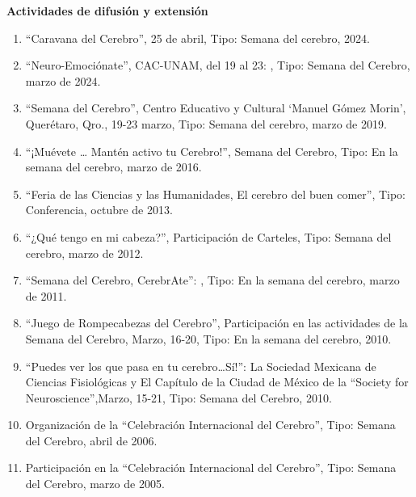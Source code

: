 {\large \textbf{Actividades de difusión y extensión}}

\hrulefill

\begin{enumerate}

\item “Caravana del Cerebro”, 25 de abril, Tipo: Semana del cerebro, 2024.

\item “Neuro-Emociónate”, CAC-UNAM, del 19 al 23: , Tipo: Semana del Cerebro, marzo de 2024.

\item “Semana del Cerebro”, Centro Educativo y Cultural ‘Manuel Gómez Morin’, Querétaro, Qro., 19-23 marzo, 
Tipo: 
Semana del cerebro, marzo de 2019.

\item “¡Muévete … Mantén activo tu Cerebro!”, Semana del Cerebro, Tipo: En la semana del cerebro, marzo de 
2016.

\item “Feria de las Ciencias y las Humanidades, El cerebro del buen comer”, Tipo: Conferencia, octubre de 
2013.

\item “¿Qué tengo en mi cabeza?”, Participación de Carteles, Tipo: Semana del cerebro, marzo de 2012.

\item “Semana del Cerebro, CerebrAte”: , Tipo: En la semana del cerebro, marzo de 2011.

\item “Juego de Rompecabezas del Cerebro”, Participación en las actividades de la Semana del Cerebro, Marzo, 
16-20, 
Tipo: En la semana del cerebro, 2010.

\item “Puedes ver los que pasa en tu cerebro…Sí!”: La Sociedad Mexicana de Ciencias Fisiológicas y El Capítulo 
de la 
Ciudad de México de la “Society for Neuroscience”,Marzo, 15-21, Tipo: Semana del Cerebro, 2010.

\item Organización de la “Celebración Internacional del Cerebro”, Tipo: Semana del Cerebro, abril de 2006.

\item Participación en la “Celebración Internacional del Cerebro”, Tipo: Semana del Cerebro, marzo de 2005.

\end{enumerate}


